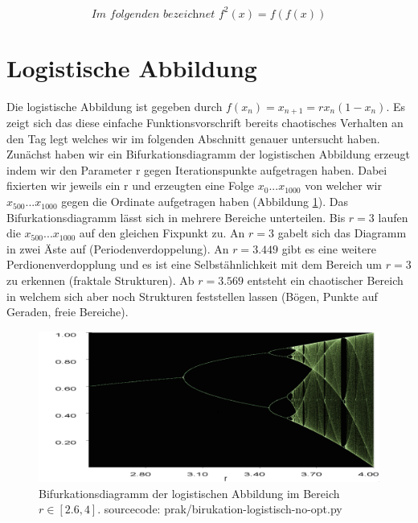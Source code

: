 \documentclass[12pt,a4paper]{article}
\begin{document}
\pagebreak
\tableofcontents
\pagebreak
$$\textit{Im folgenden bezeichnet }f^2(x) = f(f(x))$$

\section{Logistische Abbildung}
Die logistische Abbildung ist gegeben durch $f(x_n)=x_{n+1}=rx_n(1-x_n)$. Es zeigt sich das diese einfache Funktionsvorschrift 
bereits chaotisches Verhalten an den Tag legt welches wir im folgenden Abschnitt genauer untersucht haben. Zunächst haben 
wir ein Bifurkationsdiagramm der logistischen Abbildung erzeugt indem wir den Parameter r gegen Iterationspunkte aufgetragen haben. Dabei fixierten wir jeweils ein r und erzeugten eine Folge $x_0 ... x_{1000}$ von welcher wir $x_{500} ... x_{1000}$ gegen die Ordinate aufgetragen haben (Abbildung \ref{fig:bifurkation-sin-nice}).
Das Bifurkationsdiagramm lässt sich in mehrere Bereiche unterteilen. Bis $r=3$ laufen die $x_{500}...x_{1000}$ auf den gleichen Fixpunkt zu. An $r=3$ gabelt sich das Diagramm in zwei Äste auf (Periodenverdoppelung). An $r=3.449$ gibt es eine weitere Perdionenverdopplung und es ist eine Selbstähnlichkeit mit dem Bereich um $r=3$ zu erkennen (fraktale Strukturen). Ab $r=3.569$ entsteht ein chaotischer Bereich in welchem sich aber noch Strukturen feststellen lassen (Bögen, Punkte auf Geraden, freie Bereiche).
\begin{figure}[!htbp]
	\centering
	\includegraphics[scale=0.30]{bifurkation}
	\caption{Bifurkationsdiagramm der logistischen Abbildung im Bereich $r\in[2.6,4]$. sourcecode: prak/birukation-logistisch-no-opt.py}
	\label{fig:bifurkation-sin-nice}
\end{figure}
\end{document}
